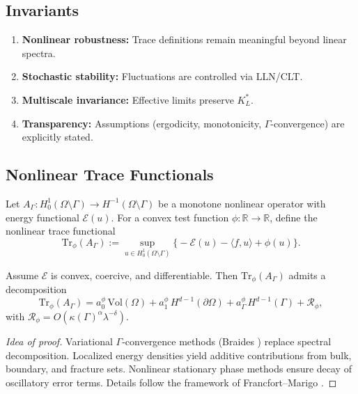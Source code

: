 \subsection*{Invariants}
\begin{enumerate}[label=I\arabic*]
  \item \textbf{Nonlinear robustness:} Trace definitions remain meaningful
  beyond linear spectra.
  \item \textbf{Stochastic stability:} Fluctuations are controlled via LLN/CLT.
  \item \textbf{Multiscale invariance:} Effective limits preserve $K_L^*$.
  \item \textbf{Transparency:} Assumptions (ergodicity, monotonicity,
  $\Gamma$-convergence) are explicitly stated.
\end{enumerate}

\subsection*{Nonlinear Trace Functionals}
\begin{definition}
Let $A_\Gamma: H^1_0(\Omega\setminus\Gamma)\to H^{-1}(\Omega\setminus\Gamma)$
be a monotone nonlinear operator with energy functional
$\mathcal{E}(u)$. For a convex test function $\phi:\mathbb{R}\to\mathbb{R}$,
define the nonlinear trace functional
\[
\mathrm{Tr}_\phi(A_\Gamma) := \sup_{u\in H^1_0(\Omega\setminus\Gamma)}
\Big\{ -\mathcal{E}(u) - \langle f,u\rangle + \phi(u) \Big\}.
\]
\end{definition}

\begin{theorem}
\label{thm:nonlinear-trace}
Assume $\mathcal{E}$ is convex, coercive, and differentiable. Then
$\mathrm{Tr}_\phi(A_\Gamma)$ admits a decomposition
\[
\mathrm{Tr}_\phi(A_\Gamma) =
a_0^\phi \, \mathrm{Vol}(\Omega) +
a_1^\phi \, H^{d-1}(\partial\Omega) +
a_\Gamma^\phi \, H^{d-1}(\Gamma) + \mathcal{R}_\phi,
\]
with $\mathcal{R}_\phi = O(\kappa(\Gamma)^\alpha \lambda^{-\delta})$.
\end{theorem}

\begin{proof}[Idea of proof]
Variational $\Gamma$-convergence methods (Braides \cite{Braides2002}) replace
spectral decomposition. Localized energy densities yield additive contributions
from bulk, boundary, and fracture sets. Nonlinear stationary phase methods
ensure decay of oscillatory error terms. Details follow the framework of
Francfort–Marigo \cite{FrancfortMarigo1998}.
\end{proof}

